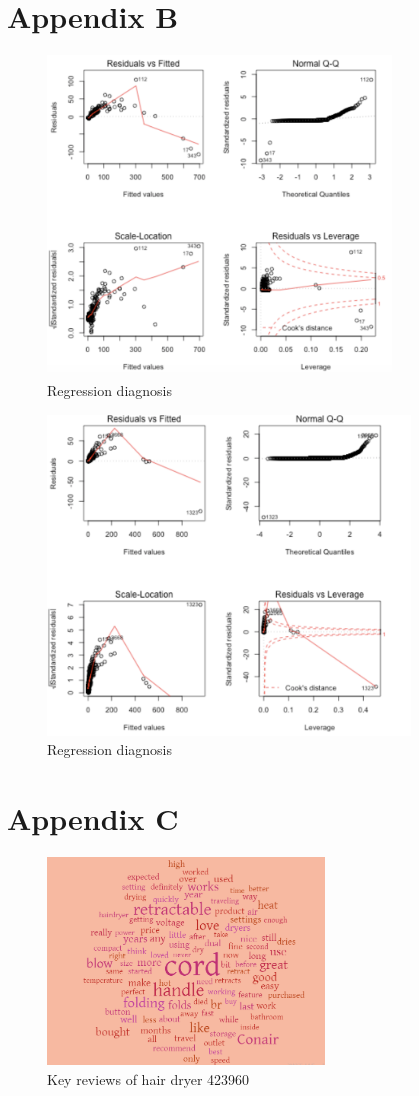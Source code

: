 \documentclass{mcmthesis}
\begin{document}
\begin{appendices}
\section*{Appendix B}
\begin{figure}[H] 
\centering
\includegraphics[width=.9\textwidth,height=8.5cm]{figures/qq2.png}
\caption{Regression diagnosis}
\end{figure}

\begin{figure}[H] 
\centering
\includegraphics[width=.9\textwidth,height=8.5cm]{figures/qq3.png}
\caption{Regression diagnosis}
\end{figure}
\section*{Appendix C}
\begin{figure}[H] 
\centering
\includegraphics[width=.9\textwidth,height=5.5cm]{figures/yun1.png}
\caption{Key reviews of hair dryer 423960}
\end{figure}


\end{appendices}
\end{document}
